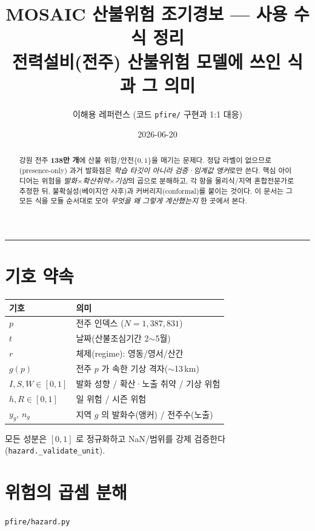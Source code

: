 \documentclass[11pt,a4paper]{article}
\title{\textbf{MOSAIC 산불위험 조기경보 — 사용 수식 정리}\\[4pt]
\large 전력설비(전주) 산불위험 모델에 쓰인 식과 그 의미}
\author{이해용 레퍼런스 (코드 \texttt{pfire/} 구현과 1:1 대응)}
\date{2026-06-20}
\newcommand{\src}[1]{{\footnotesize\color{gray}\texttt{#1}}}
\begin{document}
\maketitle

\begin{abstract}
\noindent
강원 전주 \textbf{138만 개}에 산불 위험/안전$\{0,1\}$을 매기는 문제다. 정답 라벨이
없으므로(presence-only) 과거 발화점은 \emph{학습 타깃이 아니라 검증·임계값 앵커}로만
쓴다. 핵심 아이디어는 위험을 \emph{발화}$\times$\emph{확산취약}$\times$\emph{기상}의
곱으로 분해하고, 각 항을 물리식/지역 혼합전문가로 추정한 뒤, 불확실성(베이지안 사후)과
커버리지(conformal)를 붙이는 것이다. 이 문서는 그 모든 식을 모듈 순서대로 모아
\emph{무엇을 왜 그렇게 계산했는지} 한 곳에서 본다.
\end{abstract}

\tableofcontents
\vspace{6pt}\hrule

\section{기호 약속}
\begin{tabular}{ll}
\toprule
기호 & 의미 \\
\midrule
$p$ & 전주 인덱스 ($N=1{,}387{,}831$) \\
$t$ & 날짜(산불조심기간 2$\sim$5월) \\
$r$ & 체제(regime): 영동/영서/산간 \\
$g(p)$ & 전주 $p$ 가 속한 기상 격자($\sim$13\,km) \\
$I,S,W\in[0,1]$ & 발화 성향 / 확산·노출 취약 / 기상 위험 \\
$h,R\in[0,1]$ & 일 위험 / 시즌 위험 \\
$y_g,\,n_g$ & 지역 $g$ 의 발화수(앵커) / 전주수(노출) \\
\bottomrule
\end{tabular}

모든 성분은 $[0,1]$ 로 정규화하고 NaN/범위를 강제 검증한다(\src{hazard.\_validate\_unit}).

\section{위험의 곱셈 분해}
\src{pfire/hazard.py}
\end{document}
